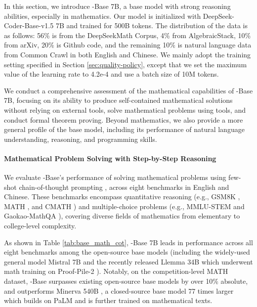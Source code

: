 In this section, we introduce \spmath-Base 7B, a base model with strong reasoning abilities, especially in mathematics.
Our model is initialized with DeepSeek-Coder-Base-v1.5 7B \citep{deepseek-coder} and trained for 500B tokens. The distribution of the data  is as follows: 56\% is from the DeepSeekMath Corpus, 4\% from AlgebraicStack, 10\% from arXiv, 20\% is Github code, and the remaining 10\% is natural language data from Common Crawl in both English and Chinese.
We mainly adopt the training setting specified in Section \ref{sec:quality-policy}, except that we set the maximum value of the learning rate to 4.2e-4 and use a batch size of 10M tokens.

We conduct a comprehensive assessment of the mathematical capabilities of \spmath-Base 7B, focusing on its ability to produce self-contained mathematical solutions without relying on external tools, solve mathematical problems using tools, and conduct formal theorem proving.
Beyond mathematics, we also provide a more general profile of the base model, including its performance of natural language understanding, reasoning, and programming skills.

\paragraph{Mathematical Problem Solving with Step-by-Step Reasoning}

We evaluate \spmath-Base's performance of solving mathematical problems using few-shot chain-of-thought prompting \citep{cot}, across eight benchmarks in English and Chinese.
These benchmarks encompass quantitative reasoning (e.g., GSM8K \citep{gsm8k}, MATH \citep{MATH}, and CMATH \citep{wei2023cmath}) and multiple-choice problems (e.g., MMLU-STEM \citep{mmlu} and Gaokao-MathQA \citep{agieval}), covering diverse fields of mathematics from elementary to college-level complexity.

As shown in Table \ref{tab:base_math_cot}, \spmath-Base 7B leads in performance across all eight benchmarks among the open-source base models (including the widely-used general model Mistral 7B \citep{mistral} and the recently released Llemma 34B \citep{llemma} which underwent math training on Proof-Pile-2 \citep{llemma}).
Notably, on the competition-level MATH dataset, \spmath-Base surpasses existing open-source base models by over 10\% absolute, and outperforms Minerva 540B \citep{minerva}, a closed-source base model 77 times larger which builds on PaLM \citep{palm} and is further trained on mathematical texts.


